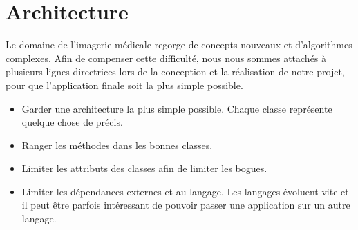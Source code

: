 \chapter{Architecture}
\minitoc

Le domaine de l'imagerie médicale regorge de concepts nouveaux et d'algorithmes complexes. Afin de compenser cette difficulté, nous nous sommes attachés à plusieurs lignes directrices lors de la conception et la réalisation de notre projet, pour que l'application finale soit la plus simple possible.

\begin{itemize}
  \item Garder une architecture la plus simple possible. Chaque classe représente quelque chose de précis.
  \item Ranger les méthodes dans les bonnes classes.
  \item Limiter les attributs des classes afin de limiter les bogues.
  \item Limiter les dépendances externes et au langage. Les langages évoluent vite et il peut être parfois intéressant de pouvoir passer une application sur un autre langage.
\end{itemize}




